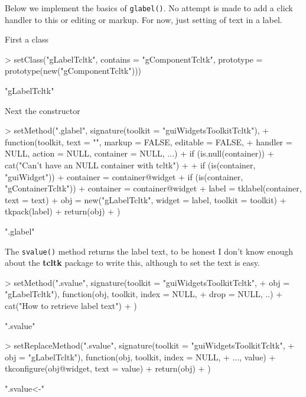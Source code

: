 \documentclass[12pt]{article}
\newcommand{\RFunc}[1]{\texttt{#1()}}
\newcommand{\RPackage}[1]{\textbf{#1}}
\begin{document}
Below we implement the basics of \RFunc{glabel}. No attempt is made to
add a click handler to this or editing or markup. For now, just
setting of text in a label.

First a class
\begin{Schunk}
\begin{Sinput}
> setClass("gLabelTcltk", contains = "gComponentTcltk", prototype = prototype(new("gComponentTcltk")))
\end{Sinput}
\begin{Soutput}
[1] "gLabelTcltk"
\end{Soutput}
\end{Schunk}


Next the constructor
\begin{Schunk}
\begin{Sinput}
> setMethod(".glabel", signature(toolkit = "guiWidgetsToolkitTcltk"), 
+     function(toolkit, text = "", markup = FALSE, editable = FALSE, 
+         handler = NULL, action = NULL, container = NULL, ...) {
+         if (is.null(container)) {
+             cat("Can't have an NULL container with tcltk")
+         }
+         if (is(container, "guiWidget")) 
+             container = container@widget
+         if (is(container, "gContainerTcltk")) 
+             container = container@widget
+         label = tklabel(container, text = text)
+         obj = new("gLabelTcltk", widget = label, toolkit = toolkit)
+         tkpack(label)
+         return(obj)
+     })
\end{Sinput}
\begin{Soutput}
[1] ".glabel"
\end{Soutput}
\end{Schunk}

The \RFunc{svalue} method returns the label text, to be honest I don't
know enough about the \RPackage{tcltk} package to write this, although
to set the text is easy.

\begin{Schunk}
\begin{Sinput}
> setMethod(".svalue", signature(toolkit = "guiWidgetsToolkitTcltk", 
+     obj = "gLabelTcltk"), function(obj, toolkit, index = NULL, 
+     drop = NULL, ..) {
+     cat("How to retrieve label text\n")
+ })
\end{Sinput}
\begin{Soutput}
[1] ".svalue"
\end{Soutput}
\begin{Sinput}
> setReplaceMethod(".svalue", signature(toolkit = "guiWidgetsToolkitTcltk", 
+     obj = "gLabelTcltk"), function(obj, toolkit, index = NULL, 
+     ..., value) {
+     tkconfigure(obj@widget, text = value)
+     return(obj)
+ })
\end{Sinput}
\begin{Soutput}
[1] ".svalue<-"
\end{Soutput}
\end{Schunk}
\end{document}
